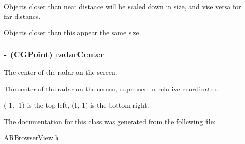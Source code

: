 \-Objects closer than near distance will be scaled down in size, and vise versa for far distance. 

\-Objects closer than this appear the same size.\hypertarget{interface_a_r_browser_view_ab390eeb9f2a9ce554dbbea33227cb389}{
\subsubsection[{radar\-Center}]{\setlength{\rightskip}{0pt plus 5cm}-\/ (\-C\-G\-Point) radar\-Center}}
\label{interface_a_r_browser_view_ab390eeb9f2a9ce554dbbea33227cb389}


\-The center of the radar on the screen. 

\-The center of the radar on the screen, expressed in relative coordinates.

(-\/1, -\/1) is the top left, (1, 1) is the bottom right. 

\-The documentation for this class was generated from the following file\-:\begin{DoxyCompactItemize}
\item 
\-A\-R\-Browser\-View.\-h\end{DoxyCompactItemize}
